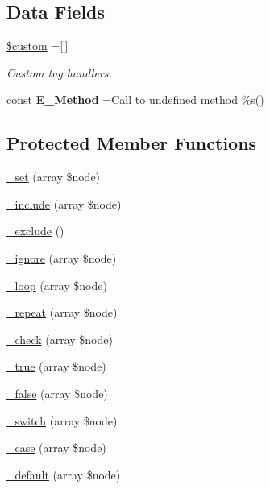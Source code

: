 \subsection*{Data Fields}
\begin{DoxyCompactItemize}
\item 
\hypertarget{class_template_aed067c1c25c780570d3191ee878d0ba2}{}\label{class_template_aed067c1c25c780570d3191ee878d0ba2} 
\hyperlink{class_template_aed067c1c25c780570d3191ee878d0ba2}{\$custom} =\mbox{[}$\,$\mbox{]}
\begin{DoxyCompactList}\small\item\em Custom tag handlers. \end{DoxyCompactList}\end{DoxyCompactItemize}
{\bf }\par
\begin{DoxyCompactItemize}
\item 
\hypertarget{class_template_a095176974668a9554e3e88442ba21baa}{}\label{class_template_a095176974668a9554e3e88442ba21baa} 
const {\bfseries E\+\_\+\+Method} =\textquotesingle{}Call to undefined method \%s()\textquotesingle{}
\end{DoxyCompactItemize}

\subsection*{Protected Member Functions}
\begin{DoxyCompactItemize}
\item 
\hyperlink{class_template_a38478c9981f9204a5f7a8ebe9c2e0f1f}{\+\_\+set} (array \$node)
\item 
\hyperlink{class_template_a93c6aa31effa27eea4ab693d6ee6bc56}{\+\_\+include} (array \$node)
\item 
\hyperlink{class_template_af5abab1b9b7dd5911927de68b50b74da}{\+\_\+exclude} ()
\item 
\hyperlink{class_template_a8e0acee0de043ee22d704799c0858dda}{\+\_\+ignore} (array \$node)
\item 
\hyperlink{class_template_acd0e2435a35935eb2c0b6f7d5593b11a}{\+\_\+loop} (array \$node)
\item 
\hyperlink{class_template_a39819dbd44517f7266ef5e39bcc37751}{\+\_\+repeat} (array \$node)
\item 
\hyperlink{class_template_a3a731dbfb5232fd26198927fcd60c886}{\+\_\+check} (array \$node)
\item 
\hyperlink{class_template_a6ec27da12c49157c7cf38f3a68a3890d}{\+\_\+true} (array \$node)
\item 
\hyperlink{class_template_ae21eec23514830fab4659fff6d031fac}{\+\_\+false} (array \$node)
\item 
\hyperlink{class_template_a2d73ae3b02526a59f54115681884da3a}{\+\_\+switch} (array \$node)
\item 
\hyperlink{class_template_ae79c95442d3831174486776ca3090bb6}{\+\_\+case} (array \$node)
\item 
\hyperlink{class_template_a3d2700d4b385c03361417f50f13e8985}{\+\_\+default} (array \$node)
\end{DoxyCompactItemize}
